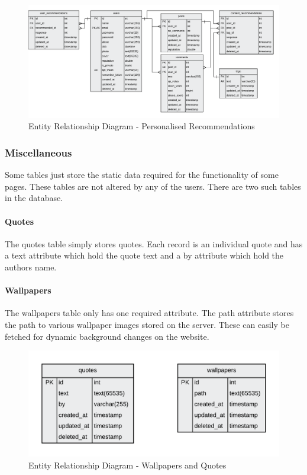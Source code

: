 \begin{figure}[H]
  \centering
  \includegraphics[width=1.0\textwidth]{Images/Design/Database/Recommendations}
  \caption{Entity Relationship Diagram - Personalised Recommendations} \label{fig:ERD_Recommendations}
\end{figure}

\subsubsection{Miscellaneous}
Some tables just store the static data required for the functionality of some pages. These tables are not altered by any of the users. There are two such tables in the database.

\paragraph{Quotes} The quotes table simply stores quotes. Each record is an individual quote and has a text attribute which hold the quote text and a by attribute which hold the authors name.

\paragraph{Wallpapers} The wallpapers table only has one required attribute. The path attribute stores the path to various wallpaper images stored on the server. These can easily be fetched for dynamic background changes on the website.

\begin{figure}[H]
  \centering
  \includegraphics[width=1.0\textwidth]{Images/Design/Database/Miscellaneous}
  \caption{Entity Relationship Diagram - Wallpapers and Quotes} \label{fig:ERD_Miscellaneous}
\end{figure}

